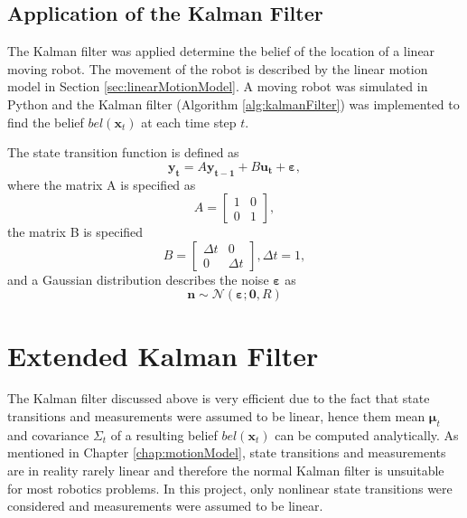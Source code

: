 \documentclass[12pt,oneside,openany,a4paper, %
afrikaans,english,
]{memoir}
\numberwithin{equation}{chapter}
\begin{document}
\subsection{Application of the Kalman Filter}
The Kalman filter was applied determine the belief of the location of a linear moving robot. The movement of the robot is described by the linear motion model in Section \ref{sec:linearMotionModel}. A moving robot was simulated in Python and the Kalman filter (Algorithm \ref{alg:kalmanFilter}) was implemented to find the belief $bel(\bm{x}_t)$ at each time step $t$.

The state transition function is defined as
\begin{equation}
\bm{y_t} = A \bm{y_{t - 1}} + B \bm{u_t} + \bm{\varepsilon},
\end{equation} 
where the matrix A is specified as
\begin{equation}
A =
\begin{bmatrix}
1 & 0\\
0 & 1
\end{bmatrix},
\end{equation}
the matrix B is specified
\begin{equation}
B =
\begin{bmatrix}
\Delta t & 0\\
0 & \Delta t
\end{bmatrix}, \Delta t = 1,
\end{equation}
and a Gaussian distribution describes the noise $\bm{\varepsilon}$ as
\begin{equation}
\bm{n} \sim \mathcal{N}(\bm{\varepsilon}; \bm{0}, R)
\end{equation}


\section{Extended Kalman Filter}
The Kalman filter discussed above is very efficient due to the fact that state transitions and measurements were assumed to be linear, hence them mean $\bm{\mu}_t$ and covariance $\Sigma_t$ of a resulting belief $bel(\bm{x}_t)$ can be computed analytically.
As mentioned in Chapter \ref{chap:motionModel}, state transitions and measurements are in reality rarely linear and therefore the normal Kalman filter is unsuitable for most robotics problems. In this project, only nonlinear state transitions were considered and measurements were assumed to be linear.
\end{document}
